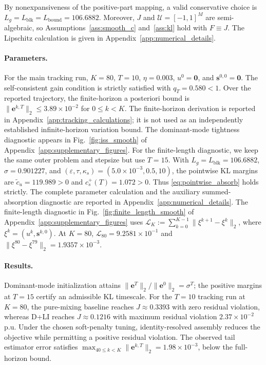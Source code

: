 \documentclass[letterpaper, 10 pt, conference]{ieeeconf} %
\begin{document}
By nonexpansiveness of the positive-part mapping, a valid conservative choice is \(L_g=L_{\mathrm{blk}}=L_{\mathrm{bound}}=106.6882\). Moreover, \(J\) and \(\mathcal U=[-1,1]^M\) are semi-algebraic, so Assumptions~\ref{ass:smooth_c} and~\ref{ass:kl} hold with \(F\equiv J\). The Lipschitz calculation is given in Appendix~\ref{app:numerical_details}.

\paragraph{Parameters.}
For the main tracking run, \(K=80\), \(T=10\), \(\eta=0.003\), \(u^0=\mathbf0\), and \(\mathbf s^{0,0}=\mathbf0\). The self-consistent gain condition is strictly satisfied with \(q_T=0.580<1\). Over the reported trajectory, the finite-horizon a posteriori bound is \(\|\mathbf e^{k,T}\|_2\le3.89\times10^{-2}\) for \(0\le k<K\).
The finite-horizon derivation is reported in Appendix~\ref{app:tracking_calculations}; it is not used as an independently established infinite-horizon variation bound. The dominant-mode tightness diagnostic appears in Fig.~\ref{fig:iss_smooth} of Appendix~\ref{app:supplementary_figures}. 
For the finite-length diagnostic, we keep the same outer problem and stepsize but use \(T=15\). With \(L_g=L_{\mathrm{blk}}=106.6882\), \(\sigma=0.901227\), and \((\varepsilon,\tau,\kappa_s)=(5.0\times10^{-3},0.5,10)\), the pointwise KL margins are \(\tilde c_u=119.989>0\) and \(c_s^{+}(T)=1.072>0\).
Thus \eqref{eq:pointwise_absorb} holds strictly. The complete parameter calculation and the auxiliary summed-absorption diagnostic are reported in Appendix~\ref{app:numerical_details}. The finite-length diagnostic in Fig.~\ref{fig:finite_length_smooth} of Appendix~\ref{app:supplementary_figures} uses \(\mathcal L_K:=\sum_{k=0}^{K-1}\|\xi^{k+1}-\xi^k\|_2\), where \(\xi^k=(u^k,\mathbf s^{k,0})\). At \(K=80\), \(\mathcal L_{80}=9.2581\times10^{-1}\) and \(\|\xi^{80}-\xi^{79}\|_2=1.9357\times10^{-3}\).
\paragraph{Results.}
Dominant-mode initialization attains \(\|\mathbf e^T\|_2/\|\mathbf e^0\|_2=\sigma^T\); the positive margins at \(T=15\) certify an admissible KL timescale. For the \(T=10\) tracking run at \(K=80\), the pure-mixing baseline reaches \(J\approx0.3393\) with zero residual violation, whereas D+LI reaches \(J\approx0.1216\) with maximum residual violation \(2.37\times10^{-2}\) p.u. Under the chosen soft-penalty tuning, identity-resolved assembly reduces the objective while permitting a positive residual violation. The observed tail estimator error satisfies \(\max_{40\le k<K}\|\mathbf e^{k,T}\|_2=1.98\times10^{-3}\), below the full-horizon bound.
\end{document}
